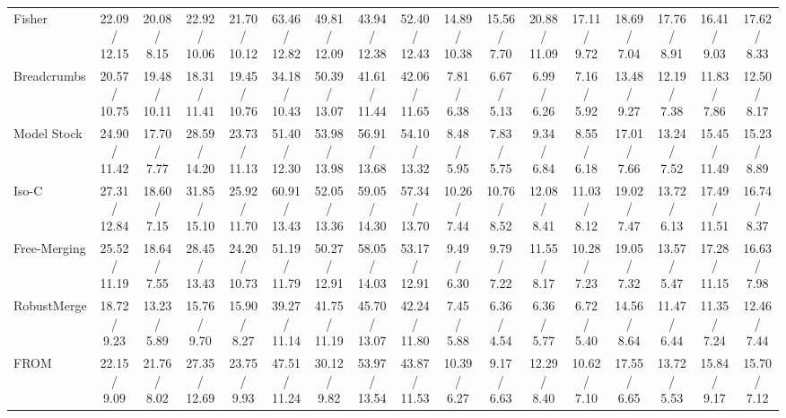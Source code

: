 \documentclass[letterpaper]{article} %
\newcommand{\pub}[1]{{\color{gray}{\footnotesize{[{#1}]}}}}
\begin{document}
\begin{table}[!t]
{\begin{tabular}{l||ccc:c|ccc:c|ccc:c|ccc:c}
Fisher\pub{NeurIPS 2022} & 22.09 / 12.15 & 20.08 / 8.15 & 22.92 / 10.06 & 21.70 / 10.12 & 63.46 / 12.82 & 49.81 / 12.09 & 43.94 / 12.38 & 52.40 / 12.43 & 14.89 / 10.38 & 15.56 / 7.70 & 20.88 / 11.09 & 17.11 / 9.72 & 18.69 / 7.04 & 17.76 / 8.91 & 16.41 / 9.03 & 17.62 / 8.33 \\

Breadcrumbs\pub{ECCV 2024} & 20.57 / 10.75 & 19.48 / 10.11 & 18.31 / 11.41 & 19.45 / 10.76 & 34.18 / 10.43 & 50.39 / 13.07 & 41.61 / 11.44 & 42.06 / 11.65 & 7.81 / 6.38 & 6.67 / 5.13 & 6.99 / 6.26 & 7.16 / 5.92 & 13.48 / 9.27 & 12.19 / 7.38 & 11.83 / 7.86 & 12.50 / 8.17 \\

Model Stock\pub{ECCV 2024} & 24.90 / 11.42 & 17.70 / 7.77 & 28.59 / 14.20 & 23.73 / 11.13 & 51.40 / 12.30 & 53.98 / 13.98 & 56.91 / 13.68 & 54.10 / 13.32 & 8.48 / 5.95 & 7.83 / 5.75 & 9.34 / 6.84 & 8.55 / 6.18 & 17.01 / 7.66 & 13.24 / 7.52 & 15.45 / 11.49 & 15.23 / 8.89 \\

Iso-C\pub{ICML 2025} & 27.31 / 12.84 & 18.60 / 7.15 & 31.85 / 15.10 & 25.92 / 11.70 & 60.91 / 13.43 & 52.05 / 13.36 & 59.05 / 14.30 & 57.34 / 13.70 & 10.26 / 7.44 & 10.76 / 8.52 & 12.08 / 8.41 & 11.03 / 8.12 & 19.02 / 7.47 & 13.72 / 6.13 & 17.49 / 11.51 & 16.74 / 8.37 \\

Free-Merging\pub{ICCV 2025} & 25.52 / 11.19 & 18.64 / 7.55 & 28.45 / 13.43 & 24.20 / 10.73 & 51.19 / 11.79 & 50.27 / 12.91 & 58.05 / 14.03 & 53.17 / 12.91 & 9.49 / 6.30 & 9.79 / 7.22 & 11.55 / 8.17 & 10.28 / 7.23 & 19.05 / 7.32 & 13.57 / 5.47 & 17.28 / 11.15 & 16.63 / 7.98 \\

RobustMerge\pub{NeurIPS 2025} & 18.72 / 9.23 & 13.23 / 5.89 & 15.76 / 9.70 & 15.90 / 8.27 & 39.27 / 11.14 & 41.75 / 11.19 & 45.70 / 13.07 & 42.24 / 11.80 & 7.45 / 5.88 & 6.36 / 4.54 & 6.36 / 5.77 & 6.72 / 5.40 & 14.56 / 8.64 & 11.47 / 6.44 & 11.35 / 7.24 & 12.46 / 7.44 \\

FROM\pub{AAAI 2026} & 22.15 / 9.09 & 21.76 / 8.02 & 27.35 / 12.69 & 23.75 / 9.93 & 47.51 / 11.24 & 30.12 / 9.82 & 53.97 / 13.54 & 43.87 / 11.53 & 10.39 / 6.27 & 9.17 / 6.63 & 12.29 / 8.40 & 10.62 / 7.10 & 17.55 / 6.65 & 13.72 / 5.53 & 15.84 / 9.17 & 15.70 / 7.12 \\


\end{tabular}}
\end{table}
\end{document}
